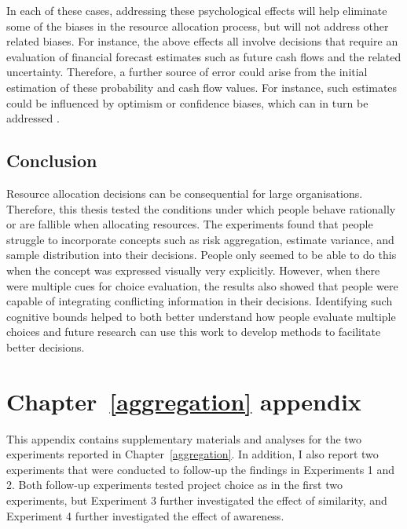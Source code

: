 \documentclass[a4paper, nobind, dvipsnames]{templates/ociamthesis}
\theoremstyle{definition}
\theoremstyle{definition}
\theoremstyle{definition}
\theoremstyle{definition}
\theoremstyle{remark}
\begin{document}
In each of these cases, addressing these psychological effects will help
eliminate some of the biases in the resource allocation process, but will not
address other related biases. For instance, the above effects all involve
decisions that require an evaluation of financial forecast estimates such as
future cash flows and the related uncertainty. Therefore, a further source of
error could arise from the initial estimation of these probability and cash flow
values. For instance, such estimates could be influenced by optimism or
confidence biases, which can in turn be addressed \autocite{flyvbjerg2018}.

\section{Conclusion}

Resource allocation decisions can be consequential for large organisations.
Therefore, this thesis tested the conditions under which people behave
rationally or are fallible when allocating resources. The experiments found that
people struggle to incorporate concepts such as risk aggregation, estimate
variance, and sample distribution into their decisions. People only seemed to be
able to do this when the concept was expressed visually very explicitly.
However, when there were multiple cues for choice evaluation, the results also
showed that people were capable of integrating conflicting information in their
decisions. Identifying such cognitive bounds helped to both better understand
how people evaluate multiple choices and future research can use this work to
develop methods to facilitate better decisions.

\newpage

\printbibliography[segment=\therefsegment,heading=subbibintoc]

\appendix


\hypertarget{aggregation-appendix}{%
\chapter{Chapter~\ref{aggregation} appendix}\label{aggregation-appendix}}

\minitoc

This appendix contains supplementary materials and analyses for the two
experiments reported in Chapter~\ref{aggregation}. In addition, I also report
two experiments that were conducted to follow-up the findings in Experiments 1
and 2. Both follow-up experiments tested project choice as in the first two
experiments, but Experiment 3 further investigated the effect of similarity, and
Experiment 4 further investigated the effect of awareness.
\end{document}
